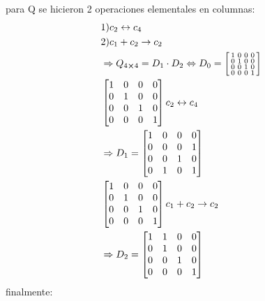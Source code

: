 	para Q se hicieron 2 operaciones elementales en columnas:
	\begin{align*}
		&\text{1)}c_2\leftrightarrow c_4\\
		&\text{2)}c_1+c_2\rightarrow c_2\\
		&\Rightarrow Q_{4\cross4}=D_1\cdot D_2 \Leftrightarrow D_0=\left[\begin{smallmatrix}
			1&0&0&0\\
			0&1&0&0\\
			0&0&1&0\\
			0&0&0&1
		\end{smallmatrix}\right]\\
		&\begin{bmatrix}
			1&0&0&0\\
			0&1&0&0\\
			0&0&1&0\\
			0&0&0&1
		\end{bmatrix} c_2\leftrightarrow c_4 \\ &\Rightarrow D_1= \begin{bmatrix}
			1&0&0&0\\
			0&0&0&1\\
			0&0&1&0\\
			0&1&0&1
		\end{bmatrix}\\
		&\begin{bmatrix}
			1&0&0&0\\
			0&1&0&0\\
			0&0&1&0\\
			0&0&0&1
		\end{bmatrix} c_1+c_2\rightarrow c_2 \\ &\Rightarrow D_2= \begin{bmatrix}
			1&1&0&0\\
			0&1&0&0\\
			0&0&1&0\\
			0&0&0&1
		\end{bmatrix}
	\end{align*}
	finalmente:
